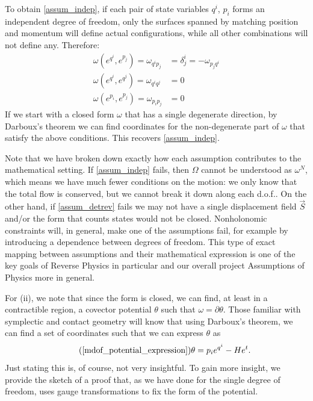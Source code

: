 \documentclass[10pt,twocolumn, nofootinbib]{revtex4-2}
\begin{document}
To obtain \ref{assum_indep}, if each pair of state variables $q^i$, $p_i$ forms an independent degree of freedom, only the surfaces spanned by matching position and momentum will define actual configurations, while all other combinations will not define any. Therefore:
\begin{equation}\label{canonical_conditions}
	\begin{aligned}
		\omega(e^{q^i}, e^{p_j}) = \omega_{q^i p_j} &= \delta^i_j = - \omega_{p_j q^i} \\
		\omega(e^{q^i}, e^{q^j}) = \omega_{q^i q^j} &= 0 \\
		\omega(e^{p_i}, e^{p_j}) = \omega_{p_i p_j} &= 0
	\end{aligned}
\end{equation}
If we start with a closed form $\omega$ that has a single degenerate direction, by Darboux's theorem we can find coordinates for the non-degenerate part of $\omega$ that satisfy the above conditions. This recovers \ref{assum_indep}.

Note that we have broken down exactly how each assumption contributes to the mathematical setting. If \ref{assum_indep} fails, then $\Omega$ cannot be understood as $\omega^N$, which means we have much fewer conditions on the motion: we only know that the total flow is conserved, but we cannot break it down along each d.o.f.. On the other hand, if \ref{assum_detrev} fails we may not have a single displacement field $\vec{S}$ and/or the form that counts states would not be closed. Nonholonomic constraints will, in general, make one of the assumptions fail, for example by introducing a dependence between degrees of freedom. This type of exact mapping between assumptions and their mathematical expression is one of the key goals of Reverse Physics in particular and our overall project Assumptions of Physics more in general.

For (ii), we note that since the form is closed, we can find, at least in a contractible region, a covector potential $\theta$ such that $\omega=\partial \theta$. Those familiar with symplectic and contact geometry will know that using Darboux's theorem, we can find a set of coordinates such that we can express $\theta$ as
\begin{equation}
	\tag*{(\ref{mdof_potential_expression})}
	\theta = p_i e^{q^i} - H e^t.
\end{equation}
Just stating this is, of course, not very insightful. To gain more insight, we provide the sketch of a proof that, as we have done for the single degree of freedom, uses gauge transformations to fix the form of the potential. 
\end{document}
